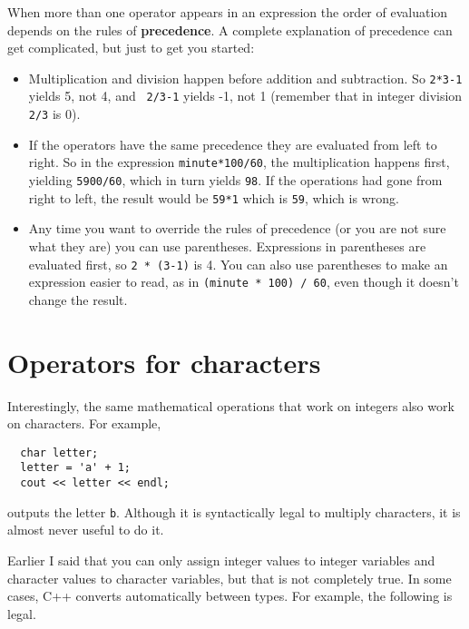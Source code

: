 When more than one operator appears in an expression the order
of evaluation depends on the rules of {\bf precedence}.  A
complete explanation of precedence can get complicated, but
just to get you started:

\begin{itemize}

\item Multiplication and division happen before
addition and subtraction.  So {\tt 2*3-1} yields 5, not 4, and {\tt
2/3-1} yields -1, not 1 (remember that in integer division {\tt 2/3}
is 0).

\item If the operators have the same precedence they are evaluated
from left to right.  So in the expression {\tt minute*100/60},
the multiplication happens first, yielding {\tt 5900/60}, which
in turn yields {\tt 98}.  If the operations had gone from right
to left, the result would be {\tt 59*1} which is {\tt 59}, which
is wrong.

\item Any time you want to override the rules of precedence (or
you are not sure what they are) you can use parentheses.  Expressions
in parentheses are evaluated first, so {\tt 2 * (3-1)} is 4.
You can also use parentheses to make an expression easier to
read, as in {\tt (minute * 100) / 60}, even though it doesn't
change the result.

\end{itemize}

\section{Operators for characters}

Interestingly, the same mathematical operations that work on
integers also work on characters.  For example,

\begin{verbatim}
  char letter;
  letter = 'a' + 1;
  cout << letter << endl;
\end{verbatim}
%
outputs the letter {\tt b}.  Although it is syntactically legal
to multiply characters, it is almost never useful to do it.

Earlier I said that you can only assign integer values to
integer variables and character values to character variables,
but that is not completely true.  In some cases, C++ converts
automatically between types.  For example, the following is
legal.

